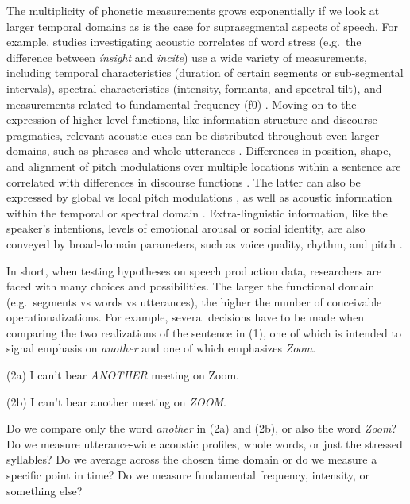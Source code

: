 \documentclass[Review,times,sageh]{sagej}
\begin{document}
The multiplicity of phonetic measurements grows exponentially if we look at larger temporal domains as is the case for suprasegmental aspects of speech.
For example, studies investigating acoustic correlates of word stress (e.g.~the difference between \emph{ínsight} and \emph{incíte}) use a wide variety of measurements, including temporal characteristics (duration of certain segments or sub-segmental intervals), spectral characteristics (intensity, formants, and spectral tilt), and measurements related to fundamental frequency (f0) \citep[e.g.,][]{gordon2017acoustic}.
Moving on to the expression of higher-level functions, like information structure and discourse pragmatics, relevant acoustic cues can be distributed throughout even larger domains, such as phrases and whole utterances \citep[e.g.,][]{ladd2008intonational}.
Differences in position, shape, and alignment of pitch modulations over multiple locations within a sentence are correlated with differences in discourse functions \citep[e.g.,][]{niebuhr2011there}.
The latter can also be expressed by global vs local pitch modulations \citep{heuven2002}, as well as acoustic information within the temporal or spectral domain \citep[e.g.,][]{van2005speech}.
Extra-linguistic information, like the speaker's intentions, levels of emotional arousal or social identity, are also conveyed by broad-domain parameters, such as voice quality, rhythm, and pitch \citep{foulkes2006, ogden2004, white2009}.

In short, when testing hypotheses on speech production data, researchers are faced with many choices and possibilities.
The larger the functional domain (e.g.~segments vs words vs utterances), the higher the number of conceivable operationalizations.
For example, several decisions have to be made when comparing the two realizations of the sentence in (1), one of which is intended to signal emphasis on \emph{another} and one of which emphasizes \emph{Zoom}.

\vspace{1em}

(2a) I can't bear \emph{ANOTHER} meeting on Zoom.

(2b) I can't bear another meeting on \emph{ZOOM}.

\vspace{1em}

Do we compare only the word \emph{another} in (2a) and (2b), or also the word \emph{Zoom}?
Do we measure utterance-wide acoustic profiles, whole words, or just the stressed syllables?
Do we average across the chosen time domain or do we measure a specific point in time?
Do we measure fundamental frequency, intensity, or something else?
\end{document}
